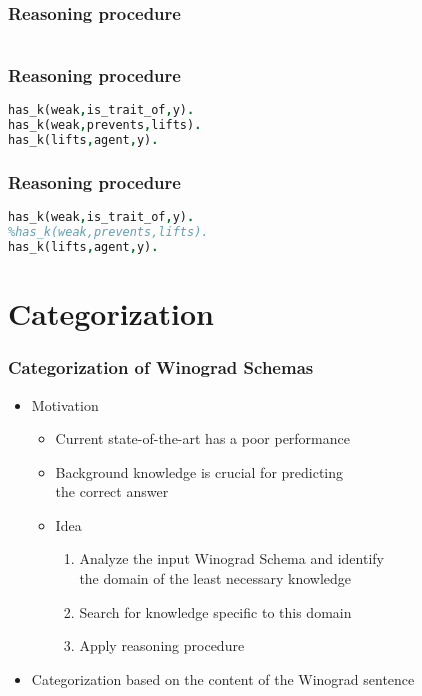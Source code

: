 \documentclass[c,8pt,xcolor...,x11names]{beamer}
\begin{document}
\begin{frame}[fragile]
\frametitle{Reasoning procedure}
\begin{columns}
	\begin{column}{0.70\textwidth}
	
	\end{column}	
\end{columns}
\end{frame}

\begin{frame}[fragile]
\frametitle{Reasoning procedure}

\centering


\begin{lstlisting}[language = Prolog, style=SC]
has_k(weak,is_trait_of,y). 		
has_k(weak,prevents,lifts).	 	
has_k(lifts,agent,y).		
\end{lstlisting}
\end{frame}

\begin{frame}[fragile]
\frametitle{Reasoning procedure}

\centering


\begin{lstlisting}[language = Prolog, style=SC]
has_k(weak,is_trait_of,y). 		
%has_k(weak,prevents,lifts).	 	
has_k(lifts,agent,y).		
\end{lstlisting}
\end{frame}

\section{Categorization} 

\begin{frame}[fragile]
\frametitle{Categorization of Winograd Schemas}

	\begin{itemize}		
	\normalsize
	\item Motivation
	\begin{itemize}
		\normalsize
		\item Current state-of-the-art has a poor performance
		\item Background knowledge is crucial for predicting\\ the correct answer 
		\onslide<2->			\item Idea
		\onslide<2->		\begin{enumerate}
			\normalsize 
			\item Analyze the input Winograd Schema and identify \\the domain of the \alert{least necessary} knowledge
			\item Search for knowledge \alert{specific} to this domain
			\item Apply reasoning procedure 
		
		\end{enumerate}
	\end{itemize}
	\item  Categorization based on the \alert{content} of the Winograd sentence
\end{itemize}   
\end{frame}
\end{document}
